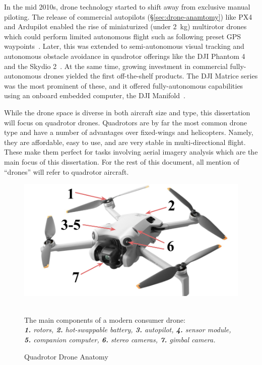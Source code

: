 In the mid 2010s, drone technology started to shift away from exclusive manual piloting. The release of commercial autopilots (\S\ref{sec:drone-anamtomy}) like PX4 and Ardupilot enabled the rise of miniaturized (under 2~kg) multirotor drones which could perform limited autonomous flight such as following preset GPS waypoints~\cite{PX4,Ardupilot}. Later, this was extended to semi-autonomous visual tracking and autonomous obstacle avoidance in quadrotor offerings like the DJI Phantom 4 and the Skydio 2~\cite{DJIPhantom4,Skydio2}. At the same time, growing investment in commercial fully-autonomous drones yielded the first off-the-shelf products. The DJI Matrice series was the most prominent of these, and it offered fully-autonomous capabilities using an onboard embedded computer, the DJI Manifold~\cite{DJIMatrice}.

While the drone space is diverse in both aircraft size and type, this dissertation will focus on quadrotor drones. Quadrotors are by far the most common drone type and have a number of advantages over fixed-wings and helicopters. Namely, they are affordable, easy to use, and are very stable in multi-directional flight. These make them perfect for tasks involving aerial imagery analysis which are the main focus of this dissertation. For the rest of this document, all mention of ``drones'' will refer to quadrotor aircraft.

\begin{figure}
    \centering
    \includegraphics[width=0.75\linewidth]{chapter2/FIGS/anatomy.png}
    \begin{captext}
    \small \\ The main components of a modern consumer drone: \\\textit{\textbf{1.} rotors, \textbf{2.} hot-swappable battery, \textbf{3.} autopilot, \textbf{4.} sensor module, \\ \textbf{5.} companion computer, \textbf{6.} stereo cameras, \textbf{7.} gimbal camera.}
    \end{captext}
    \caption{Quadrotor Drone Anatomy~\cite{DJIMini4}}
    \label{fig:drone-anatomy}
\end{figure}

